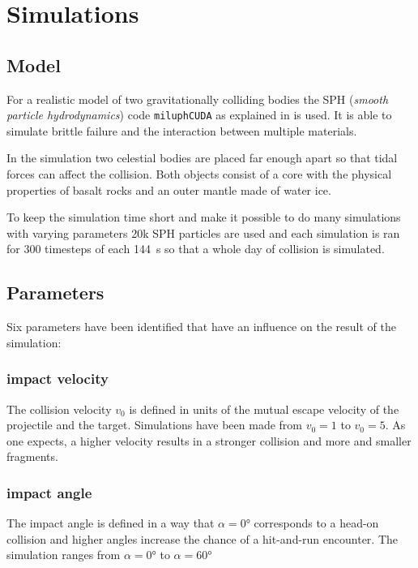 \chapter{Simulations}

\section{Model}

For a realistic model of two gravitationally colliding bodies the SPH (\textit{smooth particle hydrodynamics}) code \texttt{miluphCUDA} as explained in \cite{Schaefer2016} is used. It is able to simulate brittle failure and the interaction between multiple materials. 

In the simulation two celestial bodies are placed far enough apart so that tidal forces can affect the collision. Both objects consist of a core with the physical properties of basalt rocks and an outer mantle made of water ice. 

To keep the simulation time short and make it possible to do many simulations with varying parameters 20k SPH particles are used and each simulation is ran for 300 timesteps of each \SI{144}{\second} so that a whole day of collision is simulated.


\section{Parameters}
\label{sec:parameters}

Six parameters have been identified that have an influence on the result of the simulation:

\subsection{impact velocity}

The collision velocity $v_0$ is defined in units of the mutual escape velocity of the projectile and the target. Simulations have been made from $v_0=1$ to $v_0=5$. As one expects, a higher velocity results in a stronger collision and more and smaller fragments.

\subsection{impact angle}

The impact angle is defined in a way that $\alpha=\ang{0}$ corresponds to a head-on collision and higher angles increase the chance of a hit-and-run encounter. The simulation ranges from $\alpha=\ang{0}$ to $\alpha=\ang{60}$

